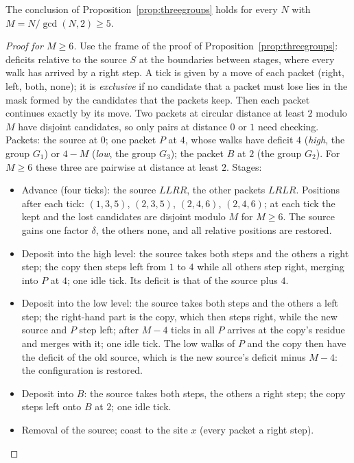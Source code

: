 \begin{proposition}\label{prop:threegroups5}
The conclusion of Proposition~\ref{prop:threegroups} holds for every $N$ with $M=N/\gcd(N,2)\ge5$.
\end{proposition}
\begin{proof}[Proof for $M\ge6$]
Use the frame of the proof of Proposition~\ref{prop:threegroups}: deficits relative to the source $S$ at the boundaries between stages, where every walk has arrived by a right step. A tick is given by a move of each packet (right, left, both, none); it is \emph{exclusive} if no candidate that a packet must lose lies in the mask formed by the candidates that the packets keep. Then each packet continues exactly by its move. Two packets at circular distance at least $2$ modulo $M$ have disjoint candidates, so only pairs at distance $0$ or $1$ need checking. Packets: the source at $0$; one packet $P$ at $4$, whose walks have deficit $4$ (\emph{high}, the group $G_1$) or $4-M$ (\emph{low}, the group $G_3$); the packet $B$ at $2$ (the group $G_2$). For $M\ge6$ these three are pairwise at distance at least $2$. Stages:
\begin{itemize}
\item Advance (four ticks): the source $LLRR$, the other packets $LRLR$. Positions after each tick: $(1,3,5)$, $(2,3,5)$, $(2,4,6)$, $(2,4,6)$; at each tick the kept and the lost candidates are disjoint modulo $M$ for $M\ge6$. The source gains one factor $\delta$, the others none, and all relative positions are restored.
\item Deposit into the high level: the source takes both steps and the others a right step; the copy then steps left from $1$ to $4$ while all others step right, merging into $P$ at $4$; one idle tick. Its deficit is that of the source plus $4$.
\item Deposit into the low level: the source takes both steps and the others a left step; the right-hand part is the copy, which then steps right, while the new source and $P$ step left; after $M-4$ ticks in all $P$ arrives at the copy's residue and merges with it; one idle tick. The low walks of $P$ and the copy then have the deficit of the old source, which is the new source's deficit minus $M-4$: the configuration is restored.
\item Deposit into $B$: the source takes both steps, the others a right step; the copy steps left onto $B$ at $2$; one idle tick.
\item Removal of the source; coast to the site $x$ (every packet a right step).

\end{itemize}
\end{proof}
